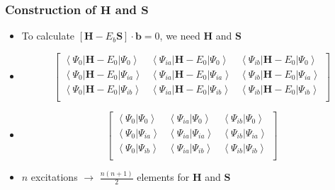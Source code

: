 \documentclass[]{beamer}
\begin{document}
\begin{frame}
  \frametitle{Construction of $\mathbf{H}$ and $\mathbf{S}$}
  \begin{itemize}  
    \item \alert<+> {To calculate $[\mathbf{H}-E_b\mathbf{S}] \cdot \mathbf{b} = 0$, we need $\mathbf{H}$ and $\mathbf{S}$}
    \item \alert<+> {\begin{equation*}\left[\begin{array}{ccc}\left< \Psi_{0} | \mathbf{H} - E_0 | \Psi_{0} \right> & \left< \Psi_{ia} | \mathbf{H} - E_0 | \Psi_{0} \right> & \left< \Psi_{ib} | \mathbf{H} - E_0 | \Psi_{0} \right> \\
                    \left< \Psi_{0} | \mathbf{H} - E_0 | \Psi_{ia} \right> & \left< \Psi_{ia} | \mathbf{H} - E_0 | \Psi_{ia} \right> & \left< \Psi_{ib} | \mathbf{H} - E_0 | \Psi_{ia} \right> \\
                    \left< \Psi_{0} | \mathbf{H} - E_0 | \Psi_{ib} \right> & \left< \Psi_{ia} | \mathbf{H} - E_0 | \Psi_{ib} \right> & \left< \Psi_{ib} | \mathbf{H} - E_0 | \Psi_{ib} \right> \\
                    \end{array}\right]
                    \end{equation*}}
        \item \alert<+> {\begin{equation*}\left[\begin{array}{ccc}\left< \Psi_{0} | \Psi_{0} \right> & \left< \Psi_{ia} | \Psi_{0} \right> & \left< \Psi_{ib} | \Psi_{0} \right> \\
                    \left< \Psi_{0} | \Psi_{ia} \right> & \left< \Psi_{ia} | \Psi_{ia} \right> & \left< \Psi_{ib} | \Psi_{ia} \right> \\
                    \left< \Psi_{0} | \Psi_{ib} \right> & \left< \Psi_{ia} | \Psi_{ib} \right> & \left< \Psi_{ib} | \Psi_{ib} \right> \\
                    \end{array}\right]
                    \end{equation*}}
    \item \alert<+> {$n$ excitations $\rightarrow$ $\frac{n(n+1)}{2}$ elements for $\mathbf{H}$ and $\mathbf{S}$}
  \end{itemize}
\end{frame}
\end{document}
